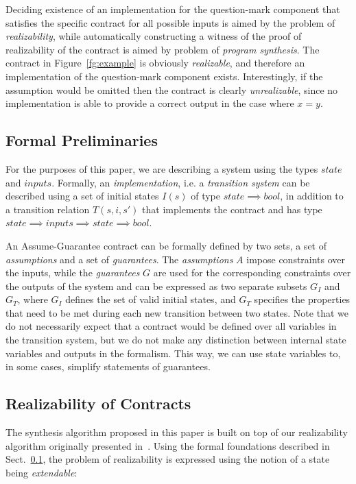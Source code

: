 Deciding existence of an implementation for the question-mark component 
that satisfies the specific contract for all possible inputs is aimed by the problem of 
\emph{realizability}, while automatically constructing a witness  of the proof 
of realizability of the contract is aimed by problem of \emph{program synthesis}.
The contract in Figure~\ref{fg:example} is obviously
\emph{realizable}, and therefore an implementation of the question-mark component exists.
Interestingly, if the assumption would be omitted then 
the contract is clearly \emph{unrealizable}, since no implementation 
is able to provide a correct output in the case where $x=y$.

\subsection{Formal Preliminaries}
\label{sec:pre}

For the purposes of this paper, we are describing a system using the types
$state$ and $inputs$. Formally, an \emph{implementation}, i.e. a
\emph{transition system} can be described using a set of initial states $I(s)$ of type $state \implies bool$, in addition to a transition relation $T(s,i,s')$ that
implements the contract and has type $state \implies inputs \implies
state \implies bool$.
 
An Assume-Guarantee contract can be formally defined by two sets, a set of
\emph{assumptions} and a set of \emph{guarantees}. The \emph{assumptions} $A$
impose constraints over the inputs, while the \emph{guarantees} $G$ are used for
the corresponding constraints over the outputs of the system and can be expressed as
two separate subsets $G_I$ and $G_T$, where $G_I$ defines the set of valid
initial states, and $G_T$ specifies the properties that need to be met during
each new transition between two states. Note that we do not necessarily expect
that a contract would be defined over all variables in the transition system,
but we do not make any distinction between internal state variables and outputs in the formalism.
This way, we can use state variables to, in some cases, simplify statements of guarantees.

\subsection{Realizability of Contracts}
The synthesis algorithm proposed in this paper is built on top of our realizability algorithm
originally presented in~\cite{Katis15:Realizability}. Using the formal foundations described in Sect.~\ref{sec:pre},
the problem of realizability is expressed using the notion of a state being \emph{extendable}:


